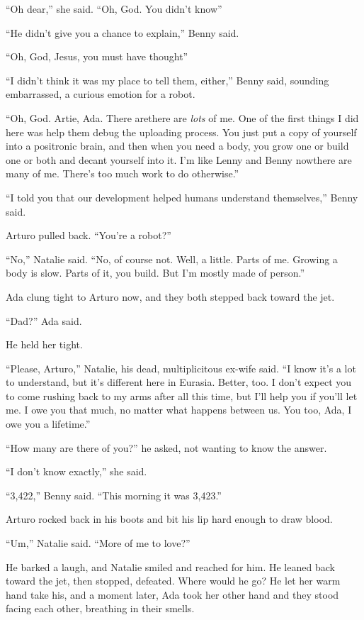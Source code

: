 “Oh dear,” she said. “Oh, God. You didn’t know{\dash}”

“He didn’t give you a chance to explain,” Benny said.

“Oh, God, Jesus, you must have thought{\dash}”

“I didn’t think it was my place to tell them, either,” Benny said,
sounding embarrassed, a curious emotion for a robot.

“Oh, God. Artie, Ada. There are{\dash}there are \emph{lots} of me. One of
the first things I did here was help them debug the uploading
process. You just put a copy of yourself into a positronic brain,
and then when you need a body, you grow one or build one or both
and decant yourself into it. I’m like Lenny and Benny now{\dash}there are
many of me. There’s too much work to do otherwise.”

“I told you that our development helped humans understand
themselves,” Benny said.

Arturo pulled back. “You’re a robot?”

“No,” Natalie said. “No, of course not. Well, a little. Parts of
me. Growing a body is slow. Parts of it, you build. But I’m mostly
made of person.”

Ada clung tight to Arturo now, and they both stepped back toward
the jet.

“Dad?” Ada said.

He held her tight.

“Please, Arturo,” Natalie, his dead, multiplicitous ex-wife said.
“I know it’s a lot to understand, but it’s different here in
Eurasia. Better, too. I don’t expect you to come rushing back to my
arms after all this time, but I’ll help you if you’ll let me. I owe
you that much, no matter what happens between us. You too, Ada, I
owe you a lifetime.”

“How many are there of you?” he asked, not wanting to know the
answer.

“I don’t know exactly,” she said.

“3,422,” Benny said. “This morning it was 3,423.”

Arturo rocked back in his boots and bit his lip hard enough to draw
blood.

“Um,” Natalie said. “More of me to love?”

He barked a laugh, and Natalie smiled and reached for him. He
leaned back toward the jet, then stopped, defeated. Where would he
go? He let her warm hand take his, and a moment later, Ada took her
other hand and they stood facing each other, breathing in their
smells.

